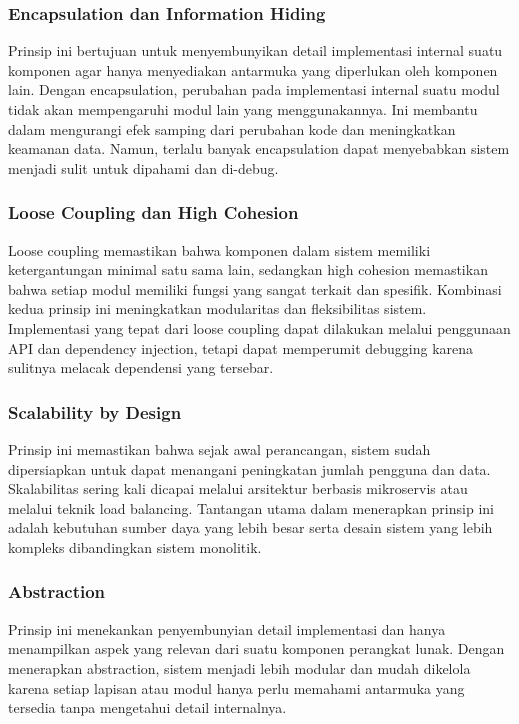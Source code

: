 \subsubsection{Encapsulation dan Information Hiding}
Prinsip ini bertujuan untuk menyembunyikan detail implementasi internal suatu komponen agar hanya menyediakan antarmuka yang diperlukan oleh komponen lain. Dengan encapsulation, perubahan pada implementasi internal suatu modul tidak akan mempengaruhi modul lain yang menggunakannya. Ini membantu dalam mengurangi efek samping dari perubahan kode dan meningkatkan keamanan data. Namun, terlalu banyak encapsulation dapat menyebabkan sistem menjadi sulit untuk dipahami dan di-debug.

\subsubsection{Loose Coupling dan High Cohesion}
Loose coupling memastikan bahwa komponen dalam sistem memiliki ketergantungan minimal satu sama lain, sedangkan high cohesion memastikan bahwa setiap modul memiliki fungsi yang sangat terkait dan spesifik. Kombinasi kedua prinsip ini meningkatkan modularitas dan fleksibilitas sistem. Implementasi yang tepat dari loose coupling dapat dilakukan melalui penggunaan API dan dependency injection, tetapi dapat memperumit debugging karena sulitnya melacak dependensi yang tersebar.

\subsubsection{Scalability by Design}
Prinsip ini memastikan bahwa sejak awal perancangan, sistem sudah dipersiapkan untuk dapat menangani peningkatan jumlah pengguna dan data. Skalabilitas sering kali dicapai melalui arsitektur berbasis mikroservis atau melalui teknik load balancing. Tantangan utama dalam menerapkan prinsip ini adalah kebutuhan sumber daya yang lebih besar serta desain sistem yang lebih kompleks dibandingkan sistem monolitik.

\subsubsection{Abstraction}  
Prinsip ini menekankan penyembunyian detail implementasi dan hanya menampilkan aspek yang relevan dari suatu komponen perangkat lunak. Dengan menerapkan abstraction, sistem menjadi lebih modular dan mudah dikelola karena setiap lapisan atau modul hanya perlu memahami antarmuka yang tersedia tanpa mengetahui detail internalnya. 

